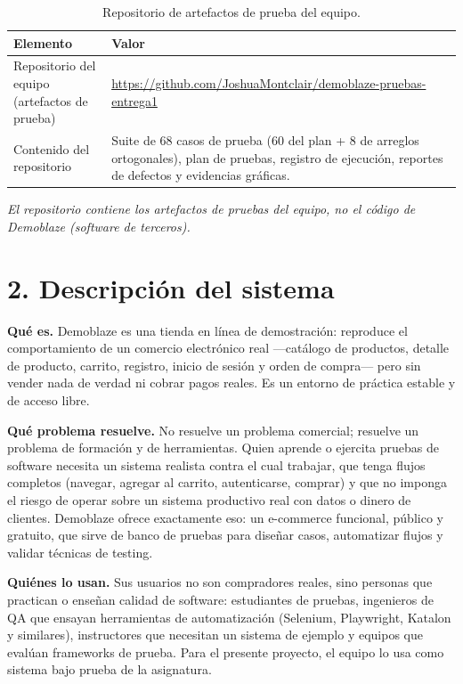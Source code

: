 \begingroup
\small
\renewcommand{\arraystretch}{1.25}
\begin{table}[htb]\centering\small
\caption{Repositorio de artefactos de prueba del equipo.}\label{tab:repo}
\begin{tabularx}{\textwidth}{@{}L{4.4cm} Y@{}}
\toprule
\textbf{Elemento} & \textbf{Valor} \\
\midrule
Repositorio del equipo (artefactos de prueba) & \url{https://github.com/JoshuaMontclair/demoblaze-pruebas-entrega1} \\
Contenido del repositorio & Suite de 68 casos de prueba (60 del plan + 8 de arreglos ortogonales), plan de pruebas, registro de ejecución, reportes de defectos y evidencias gráficas. \\
\bottomrule
\end{tabularx}
\end{table}
\endgroup

\noindent\emph{El repositorio contiene los artefactos de pruebas del equipo, no el código de Demoblaze (software de terceros).}

\FloatBarrier
\section*{2. Descripción del sistema}

\textbf{Qué es.} Demoblaze es una tienda en línea de demostración: reproduce el
comportamiento de un comercio electrónico real —catálogo de productos, detalle de
producto, carrito, registro, inicio de sesión y orden de compra— pero sin vender nada
de verdad ni cobrar pagos reales. Es un entorno de práctica estable y de acceso libre.

\textbf{Qué problema resuelve.} No resuelve un problema comercial; resuelve un problema
de formación y de herramientas. Quien aprende o ejercita pruebas de software necesita
un sistema realista contra el cual trabajar, que tenga flujos completos (navegar,
agregar al carrito, autenticarse, comprar) y que no imponga el riesgo de operar sobre
un sistema productivo real con datos o dinero de clientes. Demoblaze ofrece exactamente
eso: un e-commerce funcional, público y gratuito, que sirve de banco de pruebas para
diseñar casos, automatizar flujos y validar técnicas de testing.

\textbf{Quiénes lo usan.} Sus usuarios no son compradores reales, sino personas que
practican o enseñan calidad de software: estudiantes de pruebas, ingenieros de QA que
ensayan herramientas de automatización (Selenium, Playwright, Katalon y similares),
instructores que necesitan un sistema de ejemplo y equipos que evalúan frameworks de
prueba. Para el presente proyecto, el equipo lo usa como sistema bajo prueba de la
asignatura.

